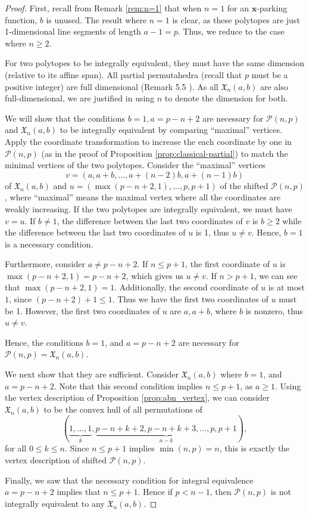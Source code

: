 \documentclass[11pt]{amsart}
\theoremstyle{definition}
\newcommand{\0}{\emptyset}
\newcommand{\X}{\mathfrak{X}}
\newcommand{\Xn}{\mathfrak{X}_{n}(a,b)}
\begin{document}
\begin{proof}
First, recall from Remark \ref{rem:n=1} that when $n=1$ for an $\mathbf{x}$-parking function, $b$ is unused. 
The result where $n=1$ is clear, as these polytopes are just 1-dimensional line segments of length $a-1 = p$.
Thus, we reduce to the case where $n \geq 2$.

For two polytopes to be integrally equivalent, they must have the same dimension (relative to its affine span). All partial permutahedra (recall that $p$ must be a positive integer) are full dimensional (Remark 5.5 \cite{HS}). As all $\X_{n}(a,b)$ are also full-dimensional, we are justified in using $n$ to denote the dimension for both.

We will show that the conditions $b=1, a=p-n+2$ are necessary for $\mathcal{P}(n,p)$ and $\Xn$ to be integrally equivalent by comparing ``maximal'' vertices. 
Apply the coordinate transformation to increase the each coordinate by one in $\mathcal{P}(n, p)$ (as in the proof of Proposition \ref{prop:classical-partial}) to match the minimal vertices of the two polytopes. 
Consider the ``maximal'' vertices \[v = (a,a+b,\ldots, a+(n-2)b, a+(n-1)b)\] of $ \Xn$ and $u= (\max(p -n +2,1), \ldots, p, p+1)$ of the shifted $\mathcal{P}(n,p)$, where ``maximal'' means the maximal vertex where all the coordinates are weakly increasing. 
If the two polytopes are integrally equivalent, we must have $v = u$.
If $b\neq 1$, the difference between the last two coordinates of $v$ is $b\geq 2$ while the difference between the last two coordinates of $u$ is 1, thus $u\neq v$. 
Hence, $b=1$ is a necessary condition.

Furthermore, consider $a \neq p -n +2$. 
If $n \leq p+1$, the first coordinate of $u$ is $\max(p -n +2,1) = p -n +2$, which gives us $u\neq v$.
If $n > p+1$, we can see that $\max(p -n +2,1) = 1$.
Additionally, the second coordinate of $u$ is at most $1$, since $(p -n +2)+1 \leq 1$.
Thus we have the first two coordinates of $u$ must be 1. 
However, the first two coordinates of $u$ are $a, a+b$, where $b$ is nonzero, thus $u\neq v$.

Hence, the conditions $b=1$, and $a = p - n +2$ are necessary for $\mathcal{P}(n,p) = \Xn$.

We next show that they are sufficient. Consider $\Xn$ where $b=1$, and $a = p - n +2$. 
Note that this second condition implies $n\leq p+1$, as $a \geq 1$.
Using the vertex description of Proposition \ref{prop:abn_vertex}, we can consider $\Xn$ to be the convex hull of all permutations of
\[ (\underbrace{1, \ldots, 1}_k, \underbrace{p -n +k+2, p -n +k+3, \ldots, p, p +1}_{n-k}),\] for all $0 \leq k \leq n$. 
Since $n\leq p+1$ implies $\min(n,p) = n$, this is exactly the vertex description of shifted $\mathcal{P}(n, p)$.

Finally, we saw that the necessary condition for integral equivalence $a = p -n+2$ implies that $n \leq p+1$. Hence if $p < n-1$, then $\mathcal{P}(n,p)$ is not integrally equivalent to any $\X_{n}(a,b)$.
\end{proof}
\end{document}
